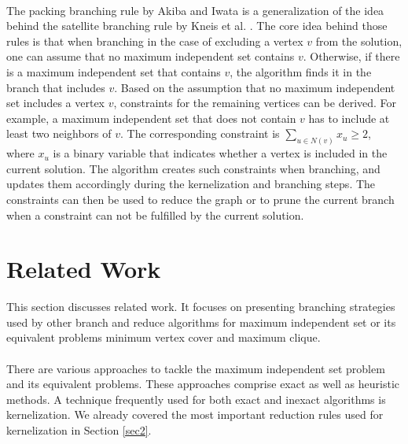 \documentclass[12pt,a4paper,twoside]{scrartcl}
\numberwithin{equation}{section}
\begin{document}
\paragraph{}
The packing branching rule by Akiba and Iwata \cite{AkibaIwata} is a generalization of the idea behind the satellite branching rule by Kneis et al. \cite{Kneis}. The core idea behind those rules is that when branching in the case of excluding a vertex $v$ from the solution, one can assume that no maximum independent set contains $v$. Otherwise, if there is a maximum independent set that contains $v$, the algorithm finds it in the branch that includes $v$. Based on the assumption that no maximum independent set includes a vertex $v$, constraints for the remaining vertices can be derived. For example, a maximum independent set that does not contain $v$ has to include at least two neighbors of $v$. The corresponding constraint is $\sum_{u\in N(v)}x_u \geq2$, where $x_u$ is a binary variable that indicates whether a vertex is included in the current solution. The algorithm creates such constraints when branching, and updates them accordingly during the kernelization and branching steps. The constraints can then be used to reduce the graph or to prune the current branch when a constraint can not be fulfilled by the current solution.

\clearpage


\section{Related Work} \label{sec3}

This section discusses related work. It focuses on presenting branching strategies used by other branch and reduce algorithms for maximum independent set or its equivalent problems minimum vertex cover and maximum clique.

\paragraph{}
There are various approaches to tackle the maximum independent set problem and its equivalent problems. These approaches comprise exact as well as heuristic methods. A technique frequently used for both exact and inexact algorithms is kernelization. We already covered the most important reduction rules used for kernelization in Section \ref{sec2}.
\end{document}
